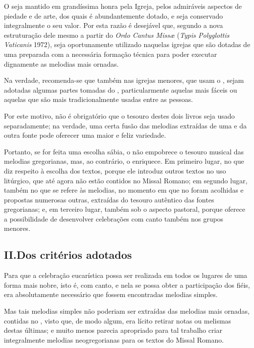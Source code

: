  O {\GR} seja mantido em grandíssima honra pela Igreja, pelos admiráveis aspectos de piedade e de arte, dos quais é abundantemente dotado, e seja conservado integralmente o seu valor. Por esta razão é desejável que, segundo a nova estruturação dele mesmo a partir do \emph{Ordo Cantus Missæ} (\emph{Typis Polyglottis Vaticanis} 1972), seja oportunamente utilizado naquelas igrejas que são dotadas de uma {\ScholaC} preparada com a necessária formação técnica para poder executar dignamente as melodias mais ornadas.

Na verdade, recomenda-se que também nas igrejas menores, que usam o {\GS}, sejam  adotadas algumas partes tomadas do {\GR}, particularmente aquelas mais fáceis ou aquelas que são mais tradicionalmente usadas entre as pessoas.

 Por este motivo, não é obrigatório que o tesouro destes dois livros seja usado separadamente; na verdade, uma certa fusão das melodias extraídas de uma e da outra fonte pode oferecer uma maior e feliz variedade.

 Portanto, se for feita uma escolha sábia, o {\GS} não empobrece o tesouro musical das melodias gregorianas, mas, ao contrário, o enriquece. Em primeiro lugar, no que diz respeito à escolha dos textos, porque ele introduz outros textos no uso litúrgico, que até agora não estão contidos no Missal Romano; em segundo lugar, também no que se refere às melodias, no momento em que no {\GS} foram acolhidas e propostas numerosas outras, extraídas do tesouro autêntico das fontes gregorianas; e, em terceiro lugar, também sob o aspecto pastoral, porque oferece a possibilidade de desenvolver celebrações com canto também nos grupos menores.

\subsection{II.\@ Dos critérios adotados}\label{subsection:praenotanda-2}

 Para que a celebração eucarística possa ser realizada em todos os lugares de uma forma mais nobre, isto é, com canto, e nela se possa obter a participação dos fiéis, era absolutamente necessário que fossem encontradas melodias simples.

 Mas tais melodias simples não poderiam ser extraídas das melodias mais ornadas, contidas no {\GR}, visto que, de modo algum, era lícito retirar notas ou melismas destas últimas; e muito menos parecia apropriado para tal trabalho criar integralmente melodias neogregorianas para os textos do Missal Romano.

